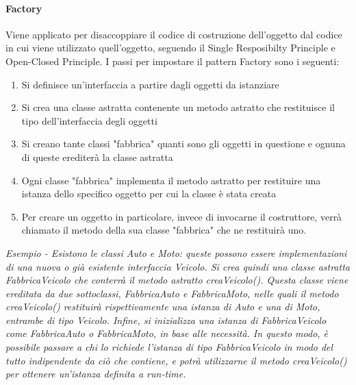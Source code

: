 \documentclass{article}
\begin{document}
            \paragraph{Factory} Viene applicato per disaccoppiare il codice di costruzione dell'oggetto dal codice in cui viene utilizzato quell'oggetto, seguendo il Single Resposibilty Principle e Open-Closed Principle.
                I passi per impostare il pattern Factory sono i seguenti:
                \begin{enumerate}
                    \item Si definisce un'interfaccia a partire dagli oggetti da istanziare
                    \item Si crea una classe astratta contenente un metodo astratto che restituisce il tipo dell'interfaccia degli oggetti
                    \item Si creano tante classi "fabbrica" quanti sono gli oggetti in questione e ognuna di queste erediterà la classe astratta
                    \item Ogni classe "fabbrica" implementa il metodo astratto per restituire una istanza dello specifico oggetto per cui la classe è stata creata
                    \item Per creare un oggetto in particolare, invece di invocarne il costruttore, verrà chiamato il metodo della sua classe "fabbrica" che ne restituirà uno. 
                \end{enumerate}
                \textit{Esempio - Esistono le classi Auto e Moto: queste possono essere implementazioni di una nuova o già esistente interfaccia Veicolo.
                    Si crea quindi una classe astratta FabbricaVeicolo che conterrà il metodo astratto creaVeicolo().
                    Questa classe viene ereditata da due sottoclassi, FabbricaAuto e FabbricaMoto, nelle quali il metodo creaVeicolo() restituirà rispettivamente una istanza di Auto e una di Moto, entrambe di tipo Veicolo.
                    Infine, si inizializza una istanza di FabbricaVeicolo come FabbricaAuto o FabbricaMoto, in base alle necessità.
                    In questo modo, è possibile passare a chi lo richiede l'istanza di tipo FabbricaVeicolo in modo del tutto indipendente da ciò che contiene, e potrà utilizzarne il metodo creaVeicolo() per ottenere un'istanza definita a run-time.
                }
\end{document}
